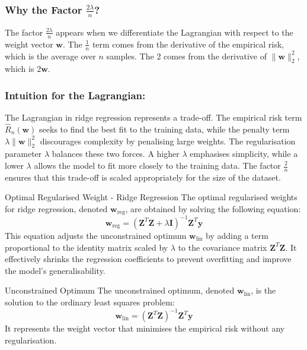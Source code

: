 \subsubsection*{Why the Factor \( \frac{2\lambda}{n} \)?}
The factor \( \frac{2\lambda}{n} \) appears when we differentiate the Lagrangian with respect to the weight vector \( \mathbf{w} \). The \( \frac{1}{n} \) term comes from the derivative of the empirical risk, which is the average over \( n \) samples. The 2 comes from the derivative of \( \|\mathbf{w}\|_2^2 \), which is \( 2\mathbf{w} \).

\subsubsection*{Intuition for the Lagrangian:}
The Lagrangian in ridge regression represents a trade-off. The empirical risk term \( \hat{R}_n(\mathbf{w}) \) seeks to find the best fit to the training data, while the penalty term \( \lambda \|\mathbf{w}\|_2^2 \) discourages complexity by penalising large weights. The regularisation parameter \( \lambda \) balances these two forces. A higher \( \lambda \) emphasises simplicity, while a lower \( \lambda \) allows the model to fit more closely to the training data. The factor \( \frac{2}{n} \) ensures that this trade-off is scaled appropriately for the size of the dataset.

\begin{definitionbox}{Optimal Regularised Weight - Ridge Regression}
The optimal regularised weights for ridge regression, denoted \( \mathbf{w}_{\text{reg}} \), are obtained by solving the following equation:
\[
\mathbf{w}_{\text{reg}} = (\mathbf{Z}^T \mathbf{Z} + \lambda \mathbf{I})^{-1} \mathbf{Z}^T \mathbf{y}
\]
This equation adjusts the unconstrained optimum \( \mathbf{w}_{\text{lin}} \) by adding a term proportional to the identity matrix scaled by \( \lambda \) to the covariance matrix \( \mathbf{Z}^T \mathbf{Z} \). It effectively shrinks the regression coefficients to prevent overfitting and improve the model's generalisability.
\end{definitionbox}

\begin{definitionbox}{Unconstrained Optimum}
The unconstrained optimum, denoted  $\mathbf{w}_\text{lin} $, is the solution to the ordinary least squares problem:
\[
\mathbf{w}_\text{lin} = (\mathbf{Z}^T \mathbf{Z})^{-1} \mathbf{Z}^T \mathbf{y}
\]
It represents the weight vector that minimises the empirical risk without any regularisation.
\end{definitionbox}


